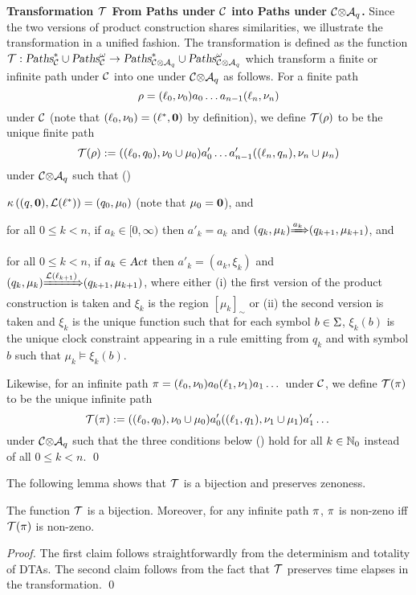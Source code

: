 {\textbf{Transformation $\mathcal{T}$ From Paths under $\mathcal{C}$ into Paths under ${\mathcal{C}}{\otimes}{\mathcal{A}_q}$.}}
Since the two versions of product construction shares similarities, we illustrate the transformation in a unified fashion.
The transformation is defined as the function $\mathcal{T}:\mbox{\sl Paths}^*_{\mathcal{C}}\cup\mbox{\sl Paths}^\omega_{\mathcal{C}}\rightarrow \mbox{\sl Paths}^*_{{\mathcal{C}}{\otimes}{\mathcal{A}_q}}\cup\mbox{\sl Paths}^\omega_{{\mathcal{C}}{\otimes}{\mathcal{A}_q}}$
which transform a finite or infinite path under $\mathcal{C}$ into one under  ${\mathcal{C}}{\otimes}{\mathcal{A}_q}$ as follows.
For a finite path
\[
\rho=(\ell_0,\nu_0)a_0\dots a_{n-1}(\ell_n,\nu_n)
\]
under $\mathcal{C}$ (note that $(\ell_0,\nu_0)=(\ell^*, \mathbf{0})$ by definition),
we define $\mathcal{T}(\rho)$ to be the unique finite path
\begin{equation}\label{eq:trho}
\mathcal{T}(\rho):=((\ell_0,q_0),\nu_0\cup\mu_0)a'_0\dots a'_{n-1}((\ell_n,q_n),\nu_n\cup\mu_n)
\end{equation}
under ${\mathcal{C}}{\otimes}{\mathcal{A}_q}$ such that (\dag)
\begin{compactitem}
\item $\kappa\left((q,\mathbf{0}), \mathcal{L}(\ell^*)\right)=(q_0,\mu_0)$ (note that $\mu_0=\mathbf{0}$), and
\item for all $0\le k< n$, if $a_k\in [0,\infty)$ then $a'_k=a_k$ and ${(q_k,\mu_k)}{\xRightarrow{a_k}}{\left(q_{k+1},\mu_{k+1}\right)}$, and
\item for all $0\le k< n$, if $a_k\in\mbox{\sl Act}$ then $a'_k=(a_k,\xi_k)$ and ${(q_k,\mu_k)}{\xRightarrow{\mathcal{L}(\ell_{k+1})}}{\left(q_{k+1},\mu_{k+1}\right)}$, where either (i) the first version of the product construction is taken and $\xi_k$ is the region $\left[\mu_k\right]_\sim$ or (ii) the second version is taken and $\xi_k$ is the unique function such that for each symbol $b\in\Sigma$, $\xi_k(b)$ is the unique clock constraint appearing in a rule emitting from $q_k$ and with symbol $b$ such that $\mu_k\models\xi_k(b)$.
\end{compactitem}
Likewise, for an infinite path $\pi=(\ell_0,\nu_0)a_0(\ell_1,\nu_1)a_1\dots$
under $\mathcal{C}$, we define $\mathcal{T}(\pi)$ to be the unique infinite path
\[
\mathcal{T}(\pi):=((\ell_0,q_0),\nu_0\cup\mu_0)a'_0((\ell_1,q_1),\nu_1\cup\mu_1)a'_1\dots
\]
under ${\mathcal{C}}{\otimes}{\mathcal{A}_q}$ such that the three conditions below (\dag) hold for all $k\in\mathbb{N}_0$ instead of all $0\le k< n$.
\qed

The following lemma shows that $\mathcal{T}$ is a bijection and preserves zenoness.

\begin{lemma}\label{lemm:pfuncbij}
The function $\mathcal{T}$ is a bijection. Moreover, for any infinite path $\pi$, $\pi$ is non-zeno iff $\mathcal{T}(\pi)$ is non-zeno.
\end{lemma}
\begin{proof}
The first claim follows straightforwardly from the determinism and totality of DTAs.
The second claim follows from the fact that $\mathcal{T}$ preserves time elapses in the transformation.
\qed
\end{proof}

